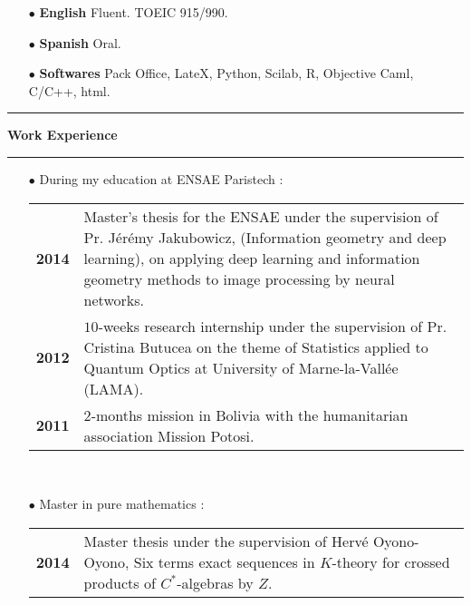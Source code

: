 \documentclass[a4paper,11pt]{article}
\newcommand\espace{\vrule height 20pt width 0pt}
\newcommand{\titre}[1]{%
	\begin{center}
	\bigskip
	\rule{\textwidth}{1pt}
	\par\vspace{0.1cm}
        \textbf{\large #1}
	\par\rule{\textwidth}{1pt}
	\end{center}
	\bigskip
	}
\begin{document}
\begin{itemize} 
\medskip
\item[$\bullet$] \textbf{English} Fluent. TOEIC 915/990.
\medskip
\item[$\bullet$] \textbf{Spanish} Oral.
\medskip
\item[$\bullet$] \textbf{Softwares} Pack Office, LateX, Python, Scilab, R, Objective Caml, C/C++, html.

\end{itemize}

\titre{Work Experience}
\begin{itemize}
\medskip
\item[$\bullet$] During my education at ENSAE Paristech : \\

\begin{tabular}{cp{}}
\textbf{2014} & Master's thesis for the ENSAE under the supervision of Pr. Jérémy Jakubowicz, (Information geometry and deep learning), on applying deep learning and information geometry methods to image processing by neural networks.\\
\textbf{2012}&  $10$-weeks research internship under the supervision of Pr. Cristina Butucea on the theme of Statistics applied to Quantum Optics at University of Marne-la-Vallée (LAMA).		\\
\textbf{2011} & $2$-months mission in Bolivia with the humanitarian association Mission Potosi.\\
\end{tabular}
\\
\espace
\item[$\bullet$] Master in pure mathematics : \\

\begin{tabular}{cp{}}
\textbf{2014} & Master thesis under the supervision of Hervé Oyono-Oyono, Six terms exact sequences in $K$-theory for crossed products of $C^*$-algebras by $Z$.\\
\end{tabular}
\\
\medskip
\end{itemize}
\end{document}
